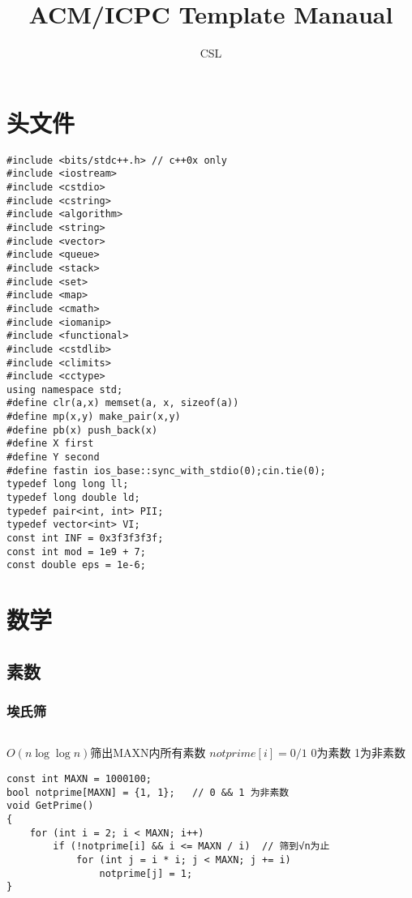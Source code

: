 \documentclass[a4]{article}
\title{ACM/ICPC Template Manaual}
\author{CSL}
\begin{document}
\large
\begin{titlepage}
\maketitle\setcounter{page}{0}\thispagestyle{empty}\clearpage
\clearpage
\tableofcontents\clearpage
\end{titlepage}
\setcounter{section}{-1}
\clearpage\section{头文件}
\begin{lstlisting}
#include <bits/stdc++.h> // c++0x only
#include <iostream>
#include <cstdio>
#include <cstring>
#include <algorithm>
#include <string>
#include <vector>
#include <queue>
#include <stack>
#include <set>
#include <map>
#include <cmath>
#include <iomanip>
#include <functional>
#include <cstdlib>
#include <climits>
#include <cctype>
using namespace std;
#define clr(a,x) memset(a, x, sizeof(a))
#define mp(x,y) make_pair(x,y)
#define pb(x) push_back(x)
#define X first
#define Y second
#define fastin ios_base::sync_with_stdio(0);cin.tie(0);
typedef long long ll;
typedef long double ld;
typedef pair<int, int> PII;
typedef vector<int> VI;
const int INF = 0x3f3f3f3f;
const int mod = 1e9 + 7;
const double eps = 1e-6;
\end{lstlisting}
\clearpage\section{数学}
\subsection{素数}
\subsubsection{埃氏筛}
\begin{lstlisting}
\end{lstlisting}
$O(n\log\log n)$筛出MAXN内所有素数
$notprime[i] = 0/1$ 0为素数 1为非素数
\begin{lstlisting}
const int MAXN = 1000100;
bool notprime[MAXN] = {1, 1};   // 0 && 1 为非素数
void GetPrime()
{
    for (int i = 2; i < MAXN; i++)
        if (!notprime[i] && i <= MAXN / i)  // 筛到√n为止
            for (int j = i * i; j < MAXN; j += i)
                notprime[j] = 1;
}
\end{lstlisting}
\end{document}
